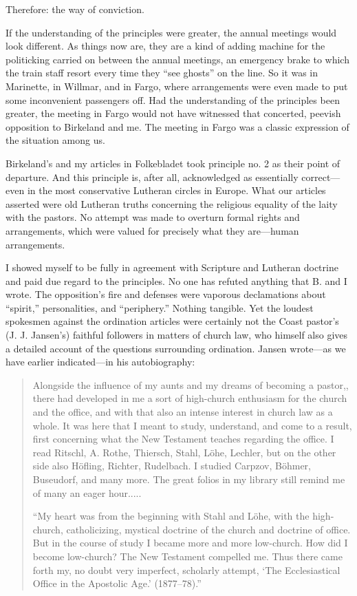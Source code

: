 Therefore: the way of conviction.

If the understanding of the principles were greater, the annual meetings would look different. As things now are, they are a kind of adding machine for the politicking carried on between the annual meetings, an emergency brake to which the train staff resort every time they “see ghosts” on the line. So it was in Marinette, in Willmar, and in Fargo, where arrangements were even made to put some inconvenient passengers off. Had the understanding of the principles been greater, the meeting in Fargo would not have witnessed that concerted, peevish opposition to Birkeland and me. The meeting in Fargo was a classic expression of the situation among us.

Birkeland’s and my articles in Folkebladet took principle no. 2 as their point of departure. And this principle is, after all, acknowledged as essentially correct—even in the most conservative Lutheran circles in Europe. What our articles asserted were old Lutheran truths concerning the religious equality of the laity with the pastors. No attempt was made to overturn formal rights and arrangements, which were valued for precisely what they are—human arrangements.

I showed myself to be fully in agreement with Scripture and Lutheran doctrine and paid due regard to the principles. No one has refuted anything that B. and I wrote. The opposition’s fire and defenses were vaporous declamations about “spirit,” personalities, and “periphery.” Nothing tangible. Yet the loudest spokesmen against the ordination articles were certainly not the Coast pastor’s (J. J. Jansen’s) faithful followers in matters of church law, who himself also gives a detailed account of the questions surrounding ordination. Jansen wrote—as we have earlier indicated—in his autobiography:

\begin{quote}
Alongside the influence of my aunts and my dreams of becoming a pastor,, there had developed in me a sort of high-church enthusiasm for the church and the office, and with that also an intense interest in church law as a whole. It was here that I meant to study, understand, and come to a result, first concerning what the New Testament teaches regarding the office. I read Ritschl, A. Rothe, Thiersch, Stahl, Löhe, Lechler, but on the other side also Höfling, Richter, Rudelbach. I studied Carpzov, Böhmer, Buseudorf, and many more. The great folios in my library still remind me of many an eager hour.....

“My heart was from the beginning with Stahl and Löhe, with the high-church, catholicizing, mystical doctrine of the church and doctrine of office. But in the course of study I became more and more low-church. How did I become low-church? The New Testament compelled me. Thus there came forth my, no doubt very imperfect, scholarly attempt, ‘The Ecclesiastical Office in the Apostolic Age.’ (1877–78).”
\end{quote}

